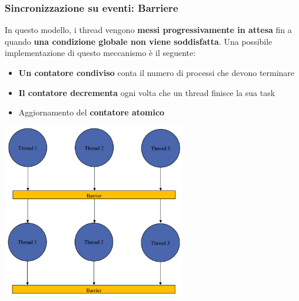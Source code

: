 \documentclass[12pt]{article}
\begin{document}
\subsubsection{Sincronizzazione su eventi: Barriere}
In questo modello, i thread vengono \textbf{messi progressivamente in attesa} fin a quando \textbf{una condizione globale non viene soddisfatta}. Una possibile implementazione di questo meccanismo è il seguente:
\begin{itemize}
    \item \textbf{Un contatore condiviso} conta il numero di processi che devono terminare
    \item \textbf{Il contatore decrementa} ogni volta che un thread finisce la sua task
    \item Aggiornamento del \textbf{contatore atomico}
\end{itemize}
\begin{center}
    \includegraphics[width = 0.60\textwidth]{Images/82.PNG}
\end{center}
\end{document}
